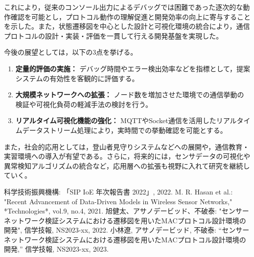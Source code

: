 \documentclass[technicalreport]{ieicej}
\begin{document}
これにより，従来のコンソール出力によるデバッグでは困難であった逐次的な動作確認を可能とし，プロトコル動作の理解促進と開発効率の向上に寄与することを示した。また，状態遷移図を中心とした設計と可視化環境の統合により，通信プロトコルの設計・実装・評価を一貫して行える開発基盤を実現した。

今後の展望としては，以下の3点を挙げる。
\begin{enumerate}
\item \textbf{定量的評価の実施：} デバッグ時間やエラー検出効率などを指標として，提案システムの有効性を客観的に評価する。
\item \textbf{大規模ネットワークへの拡張：} ノード数を増加させた環境での通信挙動の検証や可視化負荷の軽減手法の検討を行う。
\item \textbf{リアルタイム可視化機能の強化：} MQTTやSocket通信を活用したリアルタイムデータストリーム処理により，実時間での挙動確認を可能とする。
\end{enumerate}

また，社会的応用としては，登山者見守りシステムなどへの展開や，通信教育・実習環境への導入が有望である。さらに，将来的には，センサデータの可視化や異常検知アルゴリズムの統合など，応用層への拡張も視野に入れて研究を継続していく。


\baselineskip
%
%

\begin{thebibliography}{99}
 科学技術振興機構: 「SIP IoE 年次報告書 2022」, 2022.
 M. R. Hasan et al.: "Recent Advancement of Data-Driven Models in Wireless Sensor Networks," *Technologies*, vol.9, no.4, 2021.
 旭健太、アサノデービッド、不破泰: "センサーネットワーク検証システムにおける遷移図を用いたMACプロトコル設計環境の開発", 信学技報, NS2023-xx, 2022.
 小林遼, アサノデービッド, 不破泰:
“センサーネットワーク検証システムにおける遷移図を用いたMACプロトコル設計環境の開発,”
信学技報, NS2023-xx, 2023.

\end{thebibliography}
\end{document}
